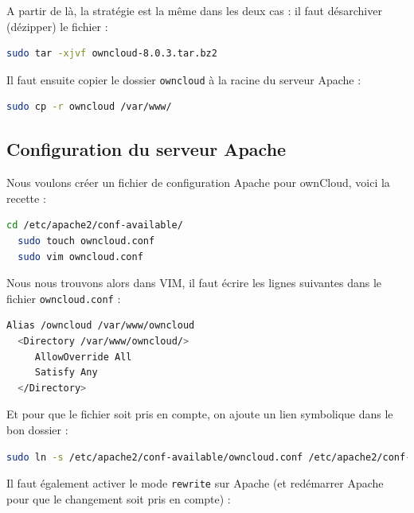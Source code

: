 A partir de là, la stratégie est la même dans les deux cas : il faut désarchiver (dézipper) le fichier : \\

\begin{lstlisting}[language=bash]
  sudo tar -xjvf owncloud-8.0.3.tar.bz2 
\end{lstlisting}

Il faut ensuite copier le dossier \texttt{owncloud} à la racine du serveur Apache : \\

\begin{lstlisting}[language=bash]
  sudo cp -r owncloud /var/www/
\end{lstlisting}

\subsection{Configuration du serveur Apache}

Nous voulons créer un fichier de configuration Apache pour ownCloud, voici la recette : \\

\begin{lstlisting}[language=bash]
  cd /etc/apache2/conf-available/
  sudo touch owncloud.conf
  sudo vim owncloud.conf
\end{lstlisting}

Nous nous trouvons alors dans VIM, il faut écrire les lignes suivantes dans le fichier \texttt{owncloud.conf} : \\

\begin{lstlisting}[language=bash]
  Alias /owncloud /var/www/owncloud
  <Directory /var/www/owncloud/>
     AllowOverride All
     Satisfy Any
  </Directory>
\end{lstlisting}


Et pour que le fichier soit pris en compte, on ajoute un lien symbolique dans le bon dossier : \\

\begin{lstlisting}[language=bash]
  sudo ln -s /etc/apache2/conf-available/owncloud.conf /etc/apache2/conf-enabled/owncloud.conf
\end{lstlisting}

Il faut également activer le mode \texttt{rewrite} sur Apache (et redémarrer Apache pour que le changement soit pris en compte) : \\

